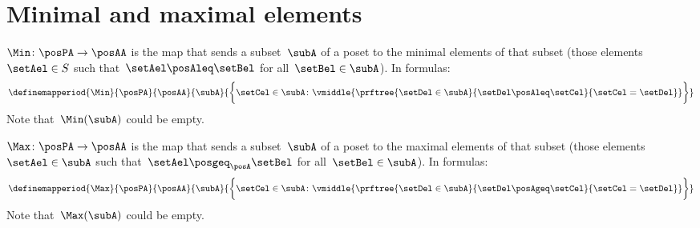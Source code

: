 \section{Minimal and maximal elements}

\begin{ctdefinition}
    \label{def:Min}
    $\Min \colon \posPA \to \posAA$ is the map that sends a subset~$\subA$ of a poset to the minimal elements of that subset (those elements~$\setAel \in S$ such that~$\setAel \posAleq \setBel$ for all~$\setBel \in \subA$).
    In formulas:
    \begin{equation*}
        \definemapperiod{\Min}{\posPA}{\posAA}{\subA}{\bigg\{
            \setCel\in \subA\colon
            \vmiddle{
                \prftree{
                    \setDel\in \subA
                }{
                    \setDel\posAleq \setCel
                }{
                    \setCel=\setDel
                }
            }
            \bigg\}}
    \end{equation*}
    Note that~$\Min(\subA)$ could be empty.
\end{ctdefinition}

\begin{ctdefinition}
    \label{def:Max}
    $\Max \colon \posPA \to \posAA$ is the map that sends a subset~$\subA$ of a poset to the maximal elements of that subset (those elements~$\setAel \in \subA$ such that~$\setAel \posgeq_\posA \setBel$ for all~$\setBel \in \subA$).
    In formulas:
    \begin{equation*}
        \definemapperiod{
            \Max
        }{
            \posPA
        }{
            \posAA
        }{
            \subA
        }{
            \bigg\{
            \setCel\in \subA\colon
            \vmiddle{
                \prftree{
                    \setDel\in \subA
                }{
                    \setDel\posAgeq \setCel
                }{
                    \setCel=\setDel
                }
            }
            \bigg\}
        }
    \end{equation*}
    Note that~$\Max(\subA)$ could be empty.
\end{ctdefinition}

